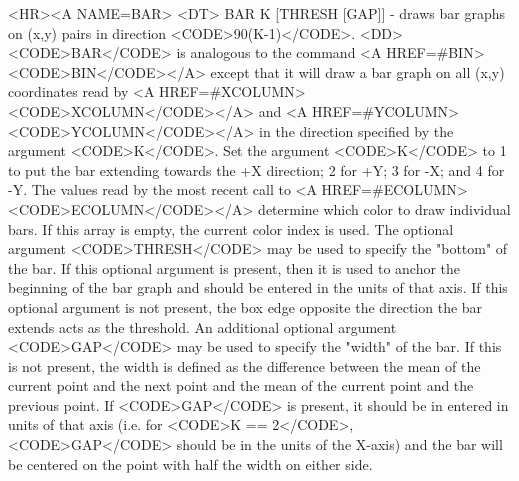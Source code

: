 \begin{rawhtml}
<HR><A NAME=BAR>
<DT>
BAR K [THRESH [GAP]] - draws bar graphs on (x,y) pairs in direction <CODE>90(K-1)</CODE>.
<DD>
	<CODE>BAR</CODE> is analogous to the command
	<A HREF=#BIN><CODE>BIN</CODE></A> except that it will draw a
	bar graph on all (x,y) coordinates read by
	<A HREF=#XCOLUMN><CODE>XCOLUMN</CODE></A> and
	<A HREF=#YCOLUMN><CODE>YCOLUMN</CODE></A> in the direction
	specified by the argument <CODE>K</CODE>.  Set the argument
	<CODE>K</CODE> to 1 to put the bar extending towards the +X
	direction; 2 for +Y; 3 for -X; and 4 for -Y.  The values read
	by the most recent call to <A HREF=#ECOLUMN><CODE>ECOLUMN</CODE></A>
	determine which color to draw individual bars.  If this array is
	empty, the current color index is used.  The optional argument
	<CODE>THRESH</CODE> may be used to specify the "bottom" of the
	bar.  If this optional argument is present, then it is used to
	anchor the beginning of the bar graph and should be entered in
	the units of that axis.  If this optional argument is not
	present, the box edge opposite the direction the bar extends
	acts as the threshold.  An additional optional argument
	<CODE>GAP</CODE> may be used to specify the "width" of the bar.
	If this is not present, the width is defined as the difference
	between the mean of the current point and the next point and the
	mean of the current point and the previous point.  If
	<CODE>GAP</CODE> is present, it should be in entered in units of
	that axis (i.e.  for <CODE>K == 2</CODE>, <CODE>GAP</CODE>
	should be in the units of the X-axis) and the bar will be
	centered on the point with half the width on either side.


\end{rawhtml}
